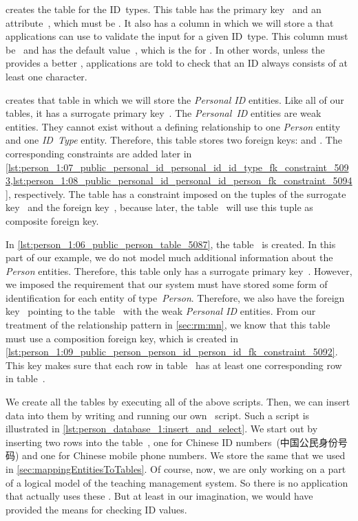  creates the table for the ID~types.
This table has the primary key~ and an attribute~, which must be .
It also has a column  in which we will store a  that applications can use to validate the input for a given ID~type.
This column must be~ and has the default value~, which is the  for .
In other words, unless the  provides a better , applications are told to check that an ID always consists of at least one character.

 creates that table in which we will store the \emph{Personal ID} entities.
Like all of our tables, it has a surrogate primary key~.
The \emph{Personal~ID} entities are weak entities.
They cannot exist without a defining relationship to one \emph{Person} entity and one \emph{ID~Type} entity.
Therefore, this table stores two foreign keys:
 and .
The corresponding constraints are added later in \cref{lst:person_1:07_public_personal_id_personal_id_id_type_fk_constraint_5093,lst:person_1:08_public_personal_id_personal_id_person_fk_constraint_5094}, respectively.
The table has a  constraint imposed on the tuples of the surrogate key~ and the foreign key~, because later, the table~ will use this tuple as composite foreign key.

In \cref{lst:person_1:06_public_person_table_5087}, the table~ is created.
In this part of our example, we do not model much additional information about the \emph{Person} entities.
Therefore, this table only has a surrogate primary key~.
However, we imposed the requirement that our system must have stored some form of identification for each entity of type~\emph{Person}.
Therefore, we also have the foreign key~ pointing to the table~ with the weak \emph{Personal ID} entities.
From our treatment of the  relationship pattern in \cref{sec:rm:mn}, we know that this table must use a composition foreign key, which is created in \cref{lst:person_1:09_public_person_person_id_person_id_fk_constraint_5092}.
This key makes sure that each row in table~ has at least one corresponding row in table~.

We create all the tables by executing all of the above scripts.
Then, we can insert data into them by writing and running our own \sql\ script.
Such a script is illustrated in \cref{lst:person_database_1:insert_and_select}.
We start out by inserting two rows into the table~, one for Chinese ID numbers~(中国公民身份号码) and one for Chinese mobile phone numbers.
We store the same  that we used in \cref{sec:mappingEntitiesToTables}.
Of course, now, we are only working on a part of a logical model of the teaching management system.
So there is no application that actually uses these .
But at least in our imagination, we would have provided the means for checking ID values.

